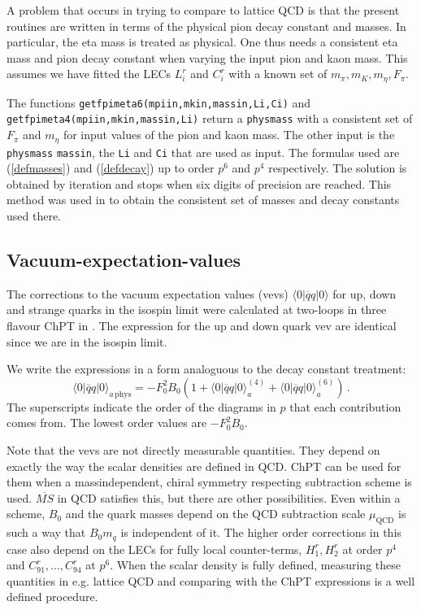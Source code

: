 \documentclass[12pt,a4paper]{article}
\begin{document}
A problem that occurs in trying to compare to lattice QCD is that
the present routines are written in terms of the physical
pion decay constant and masses. In particular, the eta mass is treated as
physical. One thus needs a consistent eta mass and pion decay constant when
varying the input pion and kaon mass. This assumes we have fitted the
LECs $L_i^r$ and $C_i^r$ with a known set of $m_\pi,m_K,m_\eta,F_\pi$.

The functions \texttt{getfpimeta6(mpiin,mkin,massin,Li,Ci)}
and\\ \texttt{getfpimeta4(mpiin,mkin,massin,Li)} return a \texttt{physmass}
with a consistent set of $F_\pi$ and $m_\eta$ for input values
of the pion and kaon mass. The other input is the \texttt{physmass}
\texttt{massin}, the \texttt{Li} and \texttt{Ci} that are used as input.
The formulas used are (\ref{defmasses}) and (\ref{defdecay}) up to order
$p^6$ and $p^4$ respectively.
The solution is obtained by iteration and stops when six digits of precision
are reached. This method was used in \cite{Bijnens:2014dea} to obtain the
consistent set of masses and decay constants used there.

\subsection{Vacuum-expectation-values}

The corrections to the vacuum expectation values (vevs)
$\langle0\vert \overline q q \vert 0\rangle$
for up, down and strange quarks in the isospin limit
were  calculated at two-loops in three flavour ChPT
in \cite{Amoros:2000mc}.
The expression for the up and down quark vev are identical since we
are in the isospin limit.

We write the expressions in a form analoguous to the decay constant
treatment:
\begin{equation}
\langle0\vert \overline q q \vert 0\rangle_{a\,\mathrm{phys}} =
- F_0^2 B_0\left(1+\langle0\vert \overline q q \vert 0\rangle_a^{(4)}+
\langle0\vert \overline q q \vert 0\rangle_a^{(6)}\right)\,.
\end{equation}
The superscripts indicate the order of the diagrams in $p$ that each
contribution comes from. The lowest order values are $-F_0^2 B_0$.

Note that the vevs are not directly measurable quantities. They depend
on exactly the way the scalar densities are defined in QCD. ChPT can be
used for them when a massindependent, chiral symmetry respecting subtraction
scheme is used. $\overline{MS}$ in QCD satisfies this, but there are other
possibilities. Even within a scheme, $B_0$ and the quark masses depend
on the QCD subtraction scale $\mu_\textrm{QCD}$ is such a way that
$B_0 m_q$ is independent of it. The higher order corrections in this
case also depend on the LECs for fully local counter-terms,
$H_1^r,H_2^r$ at order $p^4$ and $C_{91}^r,\ldots,C_{94}^r$ at $p^6$.
When the scalar density is fully defined, measuring these quantities in
e.g. lattice QCD and comparing with the ChPT expressions is a well defined
procedure.
\end{document}
